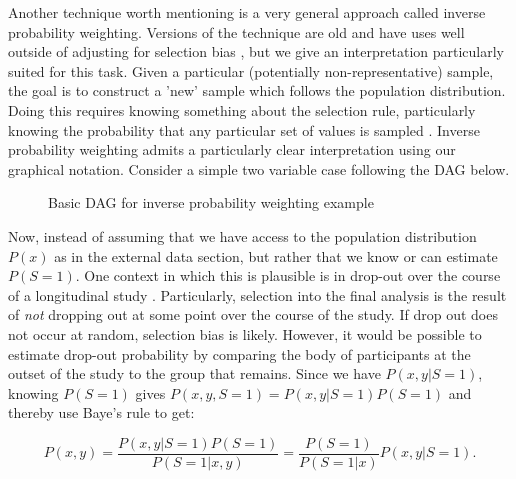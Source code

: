 \documentclass[12pt,twoside]{reedthesis}
\theoremstyle{definition}
\begin{document}
Another technique worth mentioning is a very general approach called inverse probability weighting. Versions of the technique are old  and have uses well outside of adjusting for selection bias \citep{Horvitz_1952}, but we give an interpretation particularly suited for this task. Given a particular (potentially non-representative) sample, the goal is to construct a 'new' sample which follows the population distribution. Doing this requires knowing something about the selection rule, particularly knowing the probability that any particular set of values is sampled \cite{Cortes_2008}. Inverse probability weighting admits a particularly clear interpretation using our graphical notation. Consider a simple two variable case following the DAG below.
\begin{figure}[H]
\begin{center}
\end{center}
\caption{Basic DAG for inverse probability weighting example}
\end{figure}


Now, instead of assuming that we have access to the population distribution $P(x)$ as in the external data section, but rather that we know or can estimate  $P(S = 1)$.  One context in which this is plausible is in drop-out over the course of a longitudinal study \citep{Hernan_2004}. Particularly, selection into the final analysis is the result of \emph{not} dropping out at some point over the course of the study. If drop out does not occur at random, selection bias is likely. However, it would be possible to estimate drop-out probability by comparing the body of participants at the outset of the study to the group that remains. Since we have $P(x,y | S = 1)$, knowing $P(S = 1)$ gives $P(x,y, S = 1) = P(x,y | S = 1)P(S = 1)$ and thereby use Baye's rule to get:

$$P(x,y) = \frac{P(x,y | S = 1) P(S = 1)}{P(S = 1 | x,y)} = \frac{P(S = 1)}{P(S = 1 | x )}P(x,y | S = 1).$$
\end{document}
